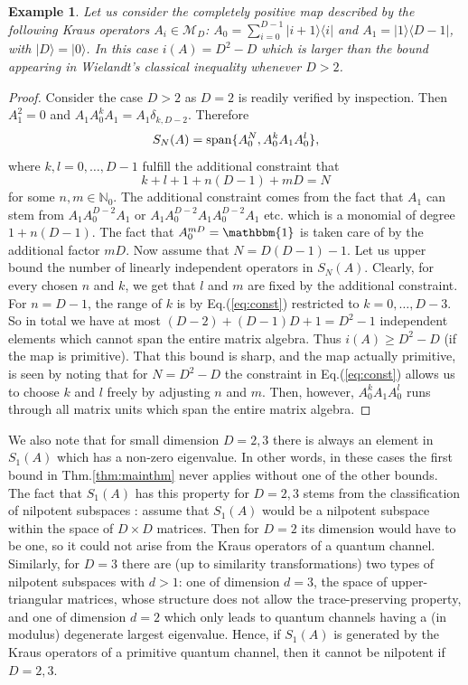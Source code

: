 \documentclass[journal,twoside]{IEEEtran}
\newtheorem{example}{Example}
\newcommand{\1}{\mathbbm{1}}
\newcommand{\be}{\begin{equation}}
\newcommand{\ee}{\end{equation}}
\renewcommand{\>}{\rangle}
\newcommand{\<}{\langle}
\def\1{\mathbbm{1}}
\begin{document}
\begin{example}
Let us consider the completely positive map described by the following Kraus operators $A_i \in
\mathcal{M}_D$: $A_0 = \sum_{i=0}^{D-1} |i+1\>\<i|$ and $A_1 =
|1\>\<D-1|$, with $|D\> = |0\>$. In this case $i(A) = D^2 - D$ which is larger than the bound appearing in Wielandt's classical inequality whenever
$D>2$.
\end{example}
\begin{proof}
Consider the case $D>2$ as $D=2$ is readily verified by inspection. Then $A_1^2=0$ and $A_1A_0^kA_1=A_1\delta_{k,D-2}$. Therefore \be S_N(A)={\rm span}\{A_0^N,A_0^kA_1A_0^l\}, \ee
where $k,l=0,\ldots,D-1$ fulfill the additional constraint that \be\label{eq:const} k+l+1+n(D-1)+m D=N \ee for some $n,m\in\mathbb{N}_0$. The additional constraint comes from the fact that $A_1$ can stem from $A_1A_0^{D-2}A_1$ or $A_1A_0^{D-2}A_1A_0^{D-2}A_1$ etc. which is a monomial of degree $1+n(D-1)$. The fact that $A_0^{mD}=\1$ is taken care of by the additional factor $mD$.  Now assume that $N=D(D-1)-1$. Let us upper bound the number of linearly independent operators in $S_N(A)$. Clearly, for every chosen $n$ and $k$, we get that  $l$ and $m$ are fixed by the additional constraint. For $n=D-1$, the range of $k$ is by Eq.(\ref{eq:const}) restricted to $k=0,\ldots, D-3$. So in total we have at most $(D-2)+(D-1)D+1=D^2-1$ independent elements which  cannot span the entire matrix algebra. Thus $i(A)\geq D^2-D$ (if the map is primitive). That this bound is sharp, and the map actually primitive, is seen by noting that for $N=D^2-D$ the constraint in Eq.(\ref{eq:const}) allows us to choose $k$ and $l$ freely by adjusting $n$ and $m$. Then, however, $A_0^kA_1A_0^l$ runs through all matrix units which span the entire matrix algebra.
\end{proof}
We also note that for small dimension $D=2,3$ there is always an element in $S_1(A)$ which has a non-zero eigenvalue. In other words, in these cases the first bound in Thm.\ref{thm:mainthm} never applies without one of the other bounds. The fact that $S_1(A)$ has this property for $D=2,3$ stems from the classification of nilpotent subspaces \cite{nilpotents}: assume that $S_1(A)$ would be a nilpotent subspace within the space of $D\times D$ matrices. Then for $D=2$ its dimension would have to be one, so it could not arise from the Kraus operators of a quantum channel. Similarly, for $D=3$ there are (up to similarity transformations) two types of nilpotent subspaces \cite{nilpotents} with $d>1$: one of dimension $d=3$, the space of upper-triangular matrices, whose structure does not allow the trace-preserving property, and one of dimension $d=2$ which only leads to quantum channels having a (in modulus) degenerate largest eigenvalue. Hence, if $S_1(A)$ is generated by the Kraus operators of a primitive quantum channel, then it cannot be nilpotent if $D=2,3$.
\end{document}
